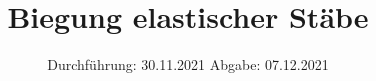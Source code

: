 

\subject{Versuch 103}
\title{Biegung elastischer Stäbe}
\date{%
  Durchführung: 30.11.2021
  \hspace{3em}
  Abgabe: 07.12.2021
}



\maketitle
\thispagestyle{empty}
\tableofcontents
\newpage






\nocite{*}
\printbibliography{}


